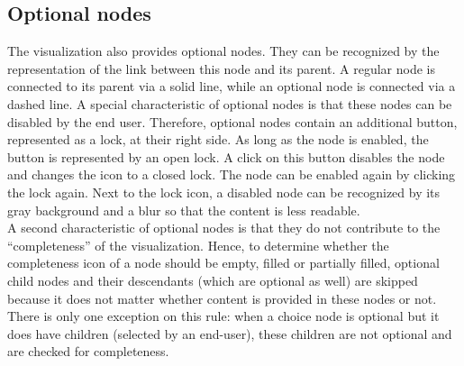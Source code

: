\subsection{Optional nodes}\label{sec:optional-nodes}
The visualization also provides optional nodes. They can be recognized by the representation of the link between this node and its parent. A regular node is connected to its parent via a solid line, while an optional node is connected via a dashed line. A special characteristic of optional nodes is that these nodes can be disabled by the end user. Therefore, optional nodes contain an additional button, represented as a lock, at their right side. As long as the node is enabled, the button is represented by an open lock. A click on this button disables the node and changes the icon to a closed lock. The node can be enabled again by clicking the lock again. Next to the lock icon, a disabled node can be recognized by its gray background and a blur so that the content is less readable. \\

A second characteristic of optional nodes is that they do not contribute to the ``completeness'' of the visualization. Hence, to determine whether the completeness icon of a node should be empty, filled or partially filled, optional child nodes and their descendants (which are optional as well) are skipped because it does not matter whether content is provided in these nodes or not. There is only one exception on this rule: when a choice node is optional but it does have children (selected by an end-user), these children are not optional and are checked for completeness.














